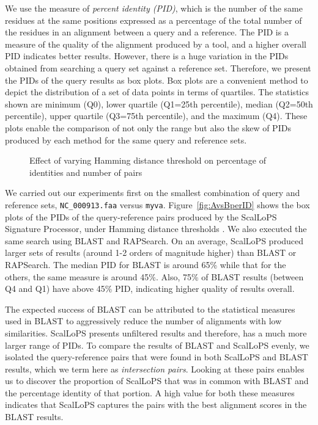 \documentclass[titlepage]{csetr}
\begin{document}
We use the measure of \emph{percent identity (PID)}, which is the number of the same residues at the same positions expressed as a percentage of the total number of the residues in an alignment between a query and a reference. The PID is a measure of the quality of the alignment produced by a tool, and a higher overall PID indicates better results.  However, there is a huge variation in the PIDs obtained from searching a query set against a reference set. Therefore, we present the PIDs of the query results as box plots. Box plots are a convenient method to depict the distribution of a set of data points in terms of quartiles. The statistics shown are minimum (Q0), lower quartile (Q1=25th percentile), median (Q2=50th percentile), upper quartile (Q3=75th percentile), and the maximum (Q4). These plots enable the comparison of not only the range but also the skew of PIDs produced by each method for the same query and reference sets.


\begin{figure}[t]
\centering
{}
\caption{Effect of varying Hamming distance threshold on percentage of identities and number of pairs}
\label{fig:exp-quality-varHD}
\end{figure}

We carried out our experiments first on the smallest combination of query and reference sets, \texttt{NC\_000913.faa} versus \texttt{myva}. Figure~\ref{fig:AvsBperID} shows the box plots of the PIDs of the query-reference pairs produced by the ScalLoPS Signature Processor, under Hamming distance thresholds . We also executed the same search using BLAST and RAPSearch. On an average, ScalLoPS produced larger sets of results (around 1-2 orders of magnitude higher) than BLAST or RAPSearch. The median PID for BLAST is around 65\% while that for the others, the same measure is around 45\%. Also, 75\% of BLAST results (between Q4 and Q1) have above 45\% PID, indicating higher quality of results overall. 

The expected success of BLAST can be attributed to the statistical measures used in BLAST to aggressively reduce the number of alignments with low similarities. ScalLoPS presents unfiltered results and therefore, has a much more larger range of PIDs. To compare the results of BLAST and ScalLoPS evenly, we isolated the query-reference pairs that were found in both ScalLoPS and BLAST results, which we term here as \emph{intersection pairs}. Looking at these pairs enables us to discover the proportion of ScalLoPS that was in common with BLAST and the percentage identity of that portion. A high value for both these measures indicates that ScalLoPS captures the pairs with the best alignment scores in the BLAST results.  
\end{document}

